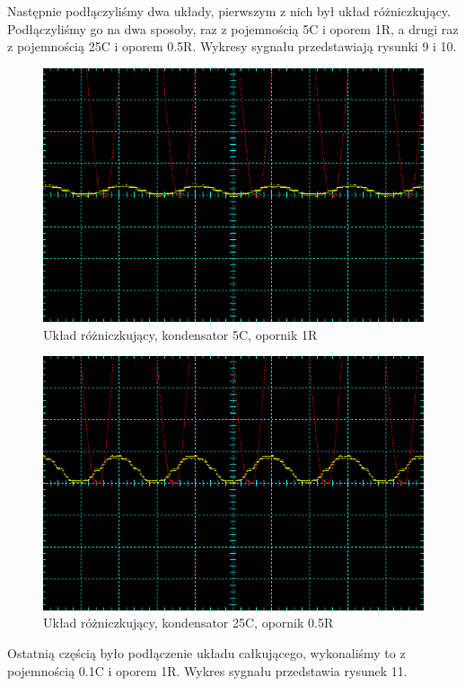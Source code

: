 \documentclass[a4paper,11pt]{article}
\begin{document}
Następnie podłączyliśmy dwa układy, pierwszym z nich był układ różniczkujący. Podłączyliśmy go na dwa sposoby, raz z pojemnością 5C i oporem 1R, a drugi raz z pojemnością 25C i oporem 0.5R. Wykresy sygnału przedstawiają rysunki 9 i 10.

\begin{figure}[ht]
 \begin{center}
  \includegraphics[width=12cm]{rozniczkujacy_5C_1R}
 \end{center}
 \caption{Układ różniczkujący, kondensator 5C, opornik 1R}
\end{figure}

\begin{figure}[ht]
 \begin{center}
  \includegraphics[width=12cm]{rozniczkujacy_25C_05R}
 \end{center}
 \caption{Układ różniczkujący, kondensator 25C, opornik 0.5R}
\end{figure}

Ostatnią częścią było podłączenie układu całkującego, wykonaliśmy to z pojemnością 0.1C i oporem 1R. Wykres sygnału przedstawia rysunek 11.
\end{document}
